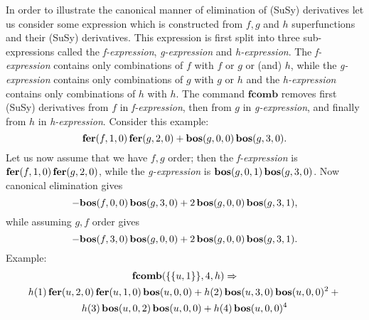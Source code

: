 {In order to illustrate the canonical manner of elimination of (SuSy)
derivatives let us consider some expression which is constructed from
$f, g$ and $h$ superfunctions and their (SuSy) derivatives.  This
expression is first split into three sub-expressions called the
\textit{f-expression}, \textit{g-expression} and
\textit{h-expression}.  The \textit{f-expression} contains only
combinations of $f$ with $f$ or $g$ or (and) $h$, while the
\textit{g-expression} contains only combinations of $g$ with $g$ or
$h$ and the \textit{h-expression} contains only combinations of $h$
with $h$.  The command $\mathbf{fcomb}$ removes first (SuSy)
derivatives from $f$ in \textit{f-expression}, then from $g$ in
\textit{g-expression}, and finally from $h$ in \textit{h-expression}.
Consider this example:
\begin{equation*}
  \mathbf{fer}(f,1,0)\,\mathbf{fer}(g,2,0) + \mathbf{bos}(g,0,0)\,\mathbf{bos}(g,3,0).
\end{equation*}
Let us now assume that we have $f,g$ order; then the
\textit{f-expression} is $\mathbf{fer}(f,1,0)\,\mathbf{fer}(g,2,0)$, while the
\textit{g-expression} is $\mathbf{bos}(g,0,1)\,\mathbf{bos}(g,3,0)$.  Now canonical
elimination gives
\begin{equation*}
  - \mathbf{bos}(f,0,0)\,\mathbf{bos}(g,3,0) + 2\,\mathbf{bos}(g,0,0)\,\mathbf{bos}(g,3,1),
\end{equation*}
while assuming $g,f$ order gives
\begin{equation*}
  - \mathbf{bos}(f,3,0)\,\mathbf{bos}(g,0,0) + 2\,\mathbf{bos}(g,0,0)\,\mathbf{bos}(g,3,1).
\end{equation*}
Example:
\begin{multline*}
  \mathbf{fcomb}(\{\{u,1\}\},4,h) \Rightarrow \\
  h(1)\,\mathbf{fer}(u,2,0)\,\mathbf{fer}(u,1,0)\,\mathbf{bos}(u,0,0) + h(2)\,\mathbf{bos}(u,3,0)\,\mathbf{bos}(u,0,0)^2 + \mbox{}\\
  h(3)\,\mathbf{bos}(u,0,2)\,\mathbf{bos}(u,0,0) + h(4)\,\mathbf{bos}(u,0,0)^4
\end{multline*}

}
